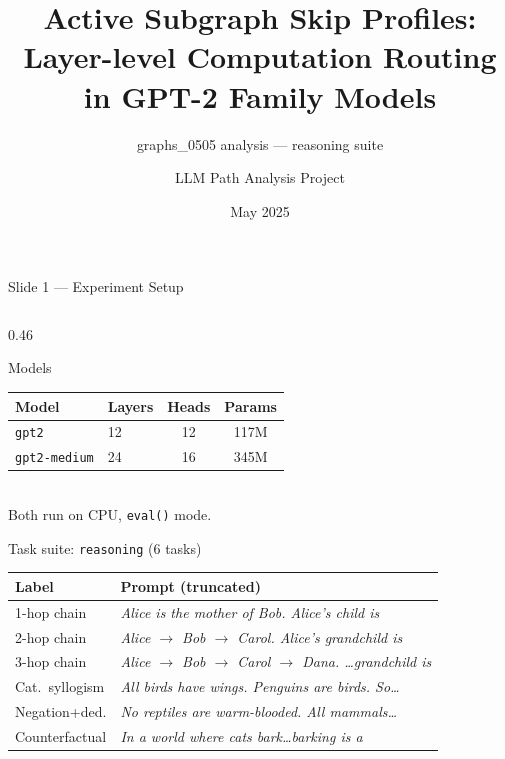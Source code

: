 \documentclass[aspectratio=169,10pt]{beamer}
\title[Skip Profiles in GPT-2 Family]{Active Subgraph Skip Profiles:\\
       Layer-level Computation Routing in GPT-2 Family Models}
\subtitle{graphs\_0505 analysis — reasoning suite}
\author{LLM Path Analysis Project}
\date{May 2025}
\begin{document}

\begin{frame}
\titlepage
\end{frame}

\begin{frame}{Slide 1 — Experiment Setup}

\begin{columns}[T]

\begin{column}{0.46\textwidth}
\begin{block}{Models}
\footnotesize
\begin{tabular}{llcc}
\toprule
Model & Layers & Heads & Params \\
\midrule
\texttt{gpt2}        & 12 & 12 & 117M \\
\texttt{gpt2-medium} & 24 & 16 & 345M \\
\bottomrule
\end{tabular}\\[4pt]
Both run on CPU, \texttt{eval()} mode.
\end{block}

\vspace{4pt}
\begin{block}{Task suite: \texttt{reasoning} (6 tasks)}
\footnotesize
\begin{tabular}{ll}
\toprule
Label & Prompt (truncated) \\
\midrule
1-hop chain  & \emph{Alice is the mother of Bob. Alice's child is} \\
2-hop chain  & \emph{Alice $\to$ Bob $\to$ Carol. Alice's grandchild is} \\
3-hop chain  & \emph{Alice $\to$ Bob $\to$ Carol $\to$ Dana. \dots grandchild is} \\
Cat.\ syllogism & \emph{All birds have wings. Penguins are birds. So\dots} \\
Negation+ded.  & \emph{No reptiles are warm-blooded. All mammals\dots} \\
Counterfactual & \emph{In a world where cats bark\dots barking is a} \\
\bottomrule
\end{tabular}
\end{block}
\end{column}


\end{columns}
\end{frame}
\end{document}
